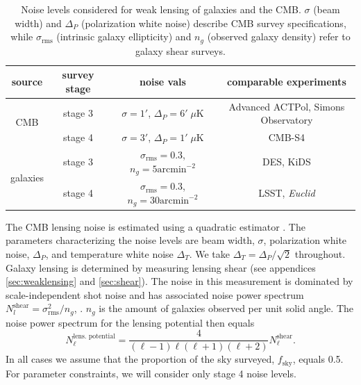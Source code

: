 \documentclass[11pt]{article} %
\begin{document}
\begin{table}[!]
    \centering
    \begin{tabular}{|c|c|c|c|}
    \hline
    \textbf{source} & \textbf{survey stage} & \textbf{noise vals} & \textbf{comparable experiments} \\
    \hline 
    \multirow{2}{*}{CMB} 
        & stage 3 & $\sigma = 1'$, $\Delta_P = 6' \; \mu \text{K}$ & Advanced ACTPol, Simons Observatory \\
    \cline{2-4}
        & stage 4 & $\sigma = 3'$, $\Delta_P = 1' \; \mu \text{K}$ & CMB-S4 \\
    \hline
    \multirow{2}{*}{galaxies} 
        & stage 3 & $\sigma_{\text{rms}} = 0.3$, $n_g = 5 \text{arcmin}^{-2}$ & DES, KiDS \\
    \cline{2-4}
        & stage 4 & $\sigma_{\text{rms}} = 0.3$, $n_g = 30 \text{arcmin}^{-2}$ & LSST, \textit{Euclid} \\
    \hline
    \end{tabular}
    \caption{Noise levels considered for weak lensing of galaxies and the CMB. $\sigma$ (beam width) and $\Delta_P$ (polarization white noise) describe CMB survey specifications, while $\sigma_{\text{rms}}$ (intrinsic galaxy ellipticity) and $n_g$ (observed galaxy density) refer to galaxy shear surveys.}
    \label{tab:noiselevels}
\end{table}

The CMB lensing noise is estimated using a quadratic estimator \cite{Maniyar2021_QE_CMBLensing}.
The parameters characterizing the noise levels are beam width, $\sigma$, polarization white noise, $\Delta_P$, and temperature white noise $\Delta_T$. We take $\Delta_T = \Delta_P / \sqrt 2$ throughout. Galaxy lensing is determined by measuring lensing shear (see appendices \ref{sec:weaklensing} and \ref{sec:shear}). The noise in this measurement is dominated by scale-independent shot noise and has associated noise power spectrum $N_l^{\text{shear}} = \sigma_{\text{rms}}^2 / n_g$, \cite{Bartelmann2001}. $n_g$ is the amount of galaxies observed per unit solid angle. The noise power spectrum for the lensing potential then equals
\begin{equation*}
    N_\ell^{\text{lens. potential}} = \frac{4}{(\ell-1)\ell(\ell+1)(\ell+2)}N_\ell^{\text{shear}}.
\end{equation*}
In all cases we assume that the proportion of the sky surveyed, $f_{\text{sky}}$, equals 0.5.
For parameter constraints, we will consider only stage 4 noise levels.
\end{document}
